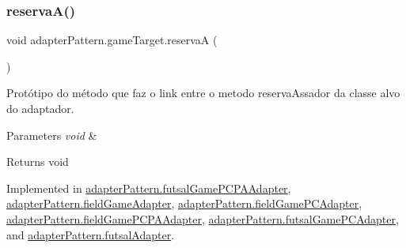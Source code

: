 \mbox{\label{interfaceadapter_pattern_1_1game_target_a67348260f14d11e317195e2d66dbff18}} 
\subsubsection{\texorpdfstring{reservaA()}{reservaA()}}
{\footnotesize\ttfamily void adapter\+Pattern.\+game\+Target.\+reservaA (\begin{DoxyParamCaption}{ }\end{DoxyParamCaption})}



Protótipo do método que faz o link entre o metodo reserva\+Assador da classe alvo do adaptador. 


\begin{DoxyParams}{Parameters}
{\em void} & \\
\hline
\end{DoxyParams}
\begin{DoxyReturn}{Returns}
void 
\end{DoxyReturn}


Implemented in \mbox{\hyperlink{classadapter_pattern_1_1futsal_game_p_c_p_a_adapter_aef67583c8fe4f45e6309ccd4c8732c4a}{adapter\+Pattern.\+futsal\+Game\+P\+C\+P\+A\+Adapter}}, \mbox{\hyperlink{classadapter_pattern_1_1field_game_adapter_aef66fcf4766fd5edd94bf729b02e5a2a}{adapter\+Pattern.\+field\+Game\+Adapter}}, \mbox{\hyperlink{classadapter_pattern_1_1field_game_p_c_adapter_ac20a8fa30e0ad92ffcac1d4b124a7000}{adapter\+Pattern.\+field\+Game\+P\+C\+Adapter}}, \mbox{\hyperlink{classadapter_pattern_1_1field_game_p_c_p_a_adapter_a75f856d4bfd4522ac2eff912c7ebf448}{adapter\+Pattern.\+field\+Game\+P\+C\+P\+A\+Adapter}}, \mbox{\hyperlink{classadapter_pattern_1_1futsal_game_p_c_adapter_a73e3f8292b7e59d30793ea7aa9f5ab29}{adapter\+Pattern.\+futsal\+Game\+P\+C\+Adapter}}, and \mbox{\hyperlink{classadapter_pattern_1_1futsal_adapter_a8c447ed3eb57e8f6789219be1cba92fe}{adapter\+Pattern.\+futsal\+Adapter}}.

\mbox{\label{interfaceadapter_pattern_1_1game_target_ae8c1c944929700a3e120e641118c9188}} 
